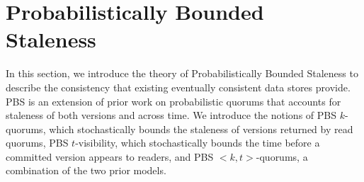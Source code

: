 \documentclass{vldb}
\begin{document}

\section{Probabilistically Bounded\\Staleness}
\label{sec:theory}

In this section, we introduce the theory of Probabilistically Bounded
Staleness to describe the consistency that existing eventually
consistent data stores provide.  PBS is an extension of prior work on
probabilistic quorums that accounts for staleness of both versions and
across time.  We introduce the notions of PBS $k$-quorums, which
stochastically bounds the staleness of versions returned by read
quorums, PBS $t$-visibility, which stochastically bounds the time
before a committed version appears to readers, and PBS $<k,
t>$-quorums, a combination of the two prior models.
\end{document}
